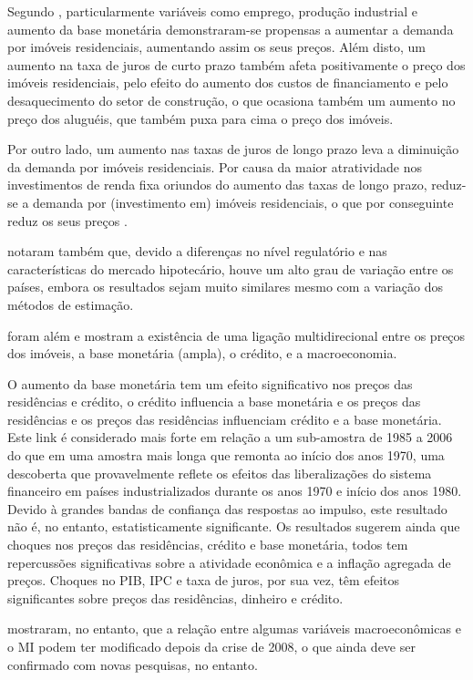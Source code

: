 \documentclass[
	12pt,				%
	oneside,			%
	a4paper,			%
	chapter=TITLE,		%
	section=TITLE,		%
	english,			%
	brazil				%
	]{abntex2}
\begin{document}
\begin{refsection}
Segundo \textcite[p.~18]{ADAMS2010}, particularmente variáveis como emprego, produção
industrial e aumento da base monetária demonstraram-se propensas a aumentar a
demanda por imóveis residenciais, aumentando assim os seus preços. Além disto,
um aumento na taxa de juros de curto prazo também afeta positivamente o preço
dos imóveis residenciais, pelo efeito do aumento dos custos de financiamento e
pelo desaquecimento do setor de construção, o que ocasiona também um aumento no
preço dos aluguéis, que também puxa para cima o preço dos imóveis.

Por outro lado, um aumento nas taxas de juros de longo prazo leva a diminuição
da demanda por imóveis residenciais. Por causa da maior atratividade nos
investimentos de renda fixa oriundos do aumento das taxas de longo prazo,
reduz-se a demanda por (investimento em) imóveis residenciais, o que
por conseguinte reduz os seus preços \autocite[19]{ADAMS2010}.

\textcite{ADAMS2010} notaram também que, devido a diferenças no nível regulatório e nas
características do mercado hipotecário, houve um alto grau de variação entre os
países, embora os resultados sejam muito similares mesmo com a variação dos
métodos de estimação.

\textcite{goodhart2008} foram além e mostram a existência de uma ligação multidirecional
entre os preços dos imóveis, a base monetária (ampla), o crédito, e a
macroeconomia.
\begin{citacao}
O aumento da base monetária tem um efeito significativo nos preços das
residências e crédito, o crédito influencia a base monetária e os preços das 
residências e os preços das residências influenciam crédito e a base monetária. 
Este link é considerado mais forte em relação a um sub-amostra de 1985 
a 2006 do que em uma amostra mais longa que remonta ao início dos anos 1970, uma 
descoberta que provavelmente reflete os efeitos das liberalizações do sistema 
financeiro em países industrializados durante os anos 1970 e início dos anos 
1980. Devido à grandes bandas de confiança das respostas ao impulso, este 
resultado não é, no entanto, estatisticamente significante. Os resultados 
sugerem ainda que choques nos preços das residências, crédito e base monetária, 
todos tem repercussões significativas sobre a atividade econômica e a inflação 
agregada de preços. Choques no PIB, IPC e taxa de juros, por sua vez, têm 
efeitos significantes sobre preços das residências, dinheiro e crédito.
\cite[31]{goodhart2008}
\end{citacao}
\textcite{macroHousing} mostraram, no entanto, que a relação entre algumas variáveis
macroeconômicas e o \gls{MI} podem ter modificado depois da crise
de 2008, o que ainda deve ser confirmado com novas pesquisas, no entanto.


\end{refsection}
\end{document}
